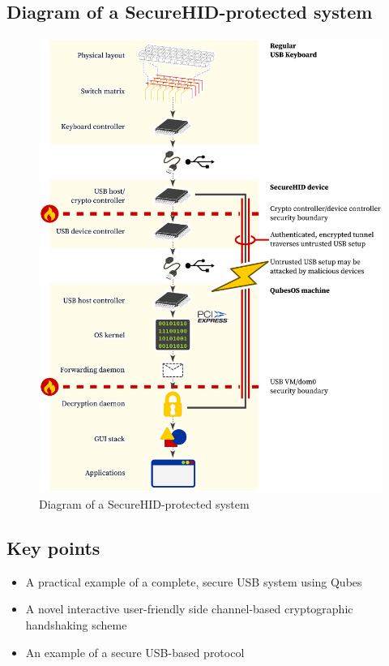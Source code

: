 \documentclass[12pt,a4paper,notitlepage]{article}
\begin{document}
\subsection{Diagram of a SecureHID-protected system}
\begin{figure}[H]
    \includegraphics[scale=0.8]{system_diagram_with_secureusb.eps}
    \caption{Diagram of a SecureHID-protected system}
    \label{diagram_with}
\end{figure}

\subsection{Key points}
\begin{itemize}
    \item A practical example of a complete, secure USB system using Qubes
    \item A novel interactive user-friendly side channel-based cryptographic handshaking scheme
    \item An example of a secure USB-based protocol
\end{itemize}
\end{document}
